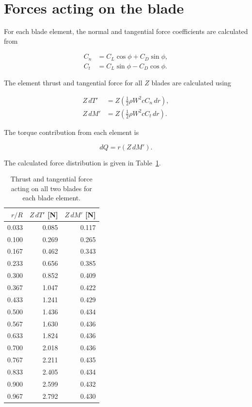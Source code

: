 \documentclass[11pt,a4paper]{article}
\begin{document}
\section{Forces acting on the blade}

For each blade element, the normal and tangential force coefficients are
calculated from

\begin{align}
C_n &= C_L\cos\phi+C_D\sin\phi,\\
C_t &= C_L\sin\phi-C_D\cos\phi.
\end{align}

The element thrust and tangential force for all $Z$ blades are calculated
using

\begin{align}
Z\,dT'
&=
Z\left(
\frac{1}{2}\rho W^2 c C_n\,dr
\right),\\
Z\,dM'
&=
Z\left(
\frac{1}{2}\rho W^2 c C_t\,dr
\right).
\end{align}

The torque contribution from each element is

\begin{equation}
dQ=r(Z\,dM').
\end{equation}

The calculated force distribution is given in
Table~\ref{tab:forces}.

\begin{table}[H]
\centering
\caption{Thrust and tangential force acting on all two blades for each blade element.}
\label{tab:forces}
\small
\begin{tabular}{rrr}
\toprule
$r/R$ & $Z\,dT'$ [N] & $Z\,dM'$ [N] \\
\midrule
0.033 & 0.085 & 0.117 \\
0.100 & 0.269 & 0.265 \\
0.167 & 0.462 & 0.343 \\
0.233 & 0.656 & 0.385 \\
0.300 & 0.852 & 0.409 \\
0.367 & 1.047 & 0.422 \\
0.433 & 1.241 & 0.429 \\
0.500 & 1.436 & 0.434 \\
0.567 & 1.630 & 0.436 \\
0.633 & 1.824 & 0.436 \\
0.700 & 2.018 & 0.436 \\
0.767 & 2.211 & 0.435 \\
0.833 & 2.405 & 0.434 \\
0.900 & 2.599 & 0.432 \\
0.967 & 2.792 & 0.430 \\
\bottomrule
\end{tabular}
\end{table}
\end{document}
